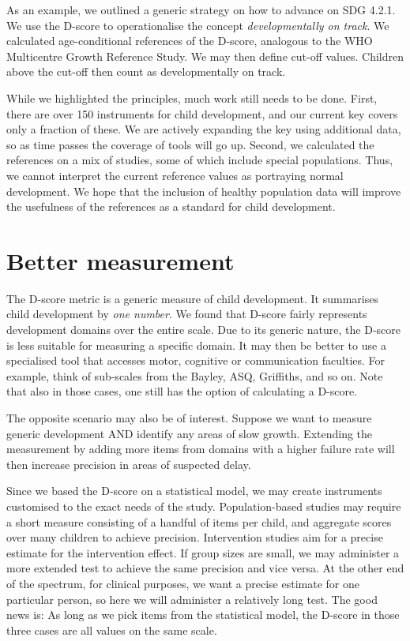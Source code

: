 \documentclass[
]{book}
\begin{document}
As an example, we outlined a generic strategy on how to advance on SDG 4.2.1. We use the D-score to operationalise the concept \emph{developmentally on track}. We calculated age-conditional references of the D-score, analogous to the WHO Multicentre Growth Reference Study. We may then define cut-off values. Children above the cut-off then count as developmentally on track.

While we highlighted the principles, much work still needs to be done. First, there are over 150 instruments for child development, and our current key covers only a fraction of these. We are actively expanding the key using additional data, so as time passes the coverage of tools will go up. Second, we calculated the references on a mix of studies, some of which include special populations. Thus, we cannot interpret the current reference values as portraying normal development. We hope that the inclusion of healthy population data will improve the usefulness of the references as a standard for child development.

\hypertarget{sec:bettermeasurement}{%
\section{Better measurement}\label{sec:bettermeasurement}}

The D-score metric is a generic measure of child development. It summarises child development by \emph{one number}. We found that D-score fairly represents development domains over the entire scale. Due to its generic nature, the D-score is less suitable for measuring a specific domain. It may then be better to use a specialised tool that accesses motor, cognitive or communication faculties. For example, think of sub-scales from the Bayley, ASQ, Griffiths, and so on. Note that also in those cases, one still has the option of calculating a D-score.

The opposite scenario may also be of interest. Suppose we want to measure generic development AND identify any areas of slow growth. Extending the measurement by adding more items from domains with a higher failure rate will then increase precision in areas of suspected delay.

Since we based the D-score on a statistical model, we may create instruments customised to the exact needs of the study. Population-based studies may require a short measure consisting of a handful of items per child, and aggregate scores over many children to achieve precision. Intervention studies aim for a precise estimate for the intervention effect. If group sizes are small, we may administer a more extended test to achieve the same precision and vice versa. At the other end of the spectrum, for clinical purposes, we want a precise estimate for one particular person, so here we will administer a relatively long test. The good news is: As long as we pick items from the statistical model, the D-score in those three cases are all values on the same scale.
\end{document}
